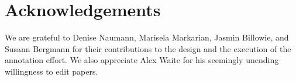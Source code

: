\documentclass[10pt,a4paper]{article}
\begin{document}
\section*{Acknowledgements}

We are grateful to Denise Naumann, Marisela Markarian, Jasmin Billowie, and
Susann Bergmann for their contributions to the design and the execution of the
annotation effort. We also appreciate Alex Waite for his seemingly unending
willingness to edit papers.


{\small
}
\end{document}
